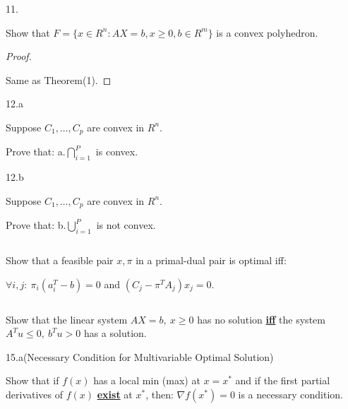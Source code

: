 \documentclass{article}
\begin{document}
\begin{customthm}{11.}
  $ $

  Show that $F = \{x \in R^n: AX=b, x\geq 0, b\in R^m \}$ is a convex polyhedron.

\end{customthm}

\begin{proof}
  $ $

  Same as Theorem(1).
\end{proof}
\newpage

\begin{customthm}{12.a}
  $ $

  Suppose $C_1,\ldots, C_p$ are convex in $R^n$.
  
  Prove that: \quad a.$\bigcap_{i=1}^P$ is convex.

\end{customthm}
\newpage

\begin{customthm}{12.b}
  $ $

  Suppose $C_1,\ldots, C_p$ are convex in $R^n$.
  
  Prove that: \quad b.$\bigcup_{i=1}^P$ is not convex.

\end{customthm}
\newpage

\begin{customthm}{13}
  $ $

  Show that a feasible pair $x,\pi$ in a primal-dual pair is optimal iff:
  
  \qquad $\forall i,j: \ \pi_i(a_i^T-b) = 0$ and $(C_j - \pi^TA_j)x_j=0$.

\end{customthm}
\newpage

\begin{customthm}{14}
  $ $

  Show that the linear system $AX=b, \ x \geq 0$ has no solution \textbf{\underline{iff}} the system $A^Tu \leq 0, \ b^Tu > 0$ has a solution.

\end{customthm}
\newpage

\begin{customthm}{15.a}{(Necessary Condition for Multivariable Optimal Solution)}
  $ $

  Show that if $f(x)$ has a local min (max) at $x=x^*$ and if the first partial derivatives of $f(x)$ \textbf{\underline{exist}} at $x^*$, then: $\nabla f(x^*) = 0$ is a necessary condition.

\end{customthm}
\end{document}
